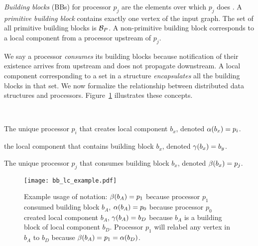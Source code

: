 \begin{definition}
 \emph{Building blocks} (BBs) for processor $p_j$ are the elements over which $p_j$ does \ufns.
 A \emph{primitive building block} contains exactly one vertex of the input graph. The set of all primitive building blocks is ${\cal B}_P$. A non-primitive building block corresponds to a local component from a processor upstream of $p_j$.
\end{definition}

We say a processor \emph{consumes} its building blocks because notification of
their existence arrives from upstream and does not propagate downstream.
A local component corresponding to a
set in a \uf structure \emph{encapsulates} all the building
blocks in that set.  We now formalize the relationship between \XStream
distributed data structures and \XStream processors.  Figure~\ref{fig:BBLCexample} illustrates these concepts.

\begin{definition} 
\label{def:alpha}
\begin{tcolorbox}
\begin{description} 
\item \
\item[{\bf $\lcloc$}:] The unique processor $p_i$ that creates local component $b_x$,  denoted $\alpha(b_x) = p_i$.
\item[{\bf $\nodeusr$}:] the local component that contains building block $b_x$,
denoted $\gamma(b_x) = b_y$.
\item[{\bf $\nodeloc$:}]
The unique processor $p_j$ that consumes building block $b_x$, denoted
$\beta(b_x) = p_j$.
\end{description}
\end{tcolorbox}
\end{definition}

\begin{figure}[hbt]
\centerline{\texttt{[image: bb\_lc\_example.pdf]}}
\caption{\label{fig:BBLCexample}
Example usage of notation: 
$\beta(b_A)=p_1$ because processor $p_1$ consumed building block $b_A$, $\alpha(b_A) = p_0$ because processor $p_0$ created local component $b_A$, $\gamma(b_A) = b_D$ because $b_A$ is a building block of local component $b_D$. Processor $p_1$ will relabel any vertex in $b_A$ to $b_D$ because
$\beta(b_A)= p_1 = \alpha(b_D)$. 
}
\end{figure}

